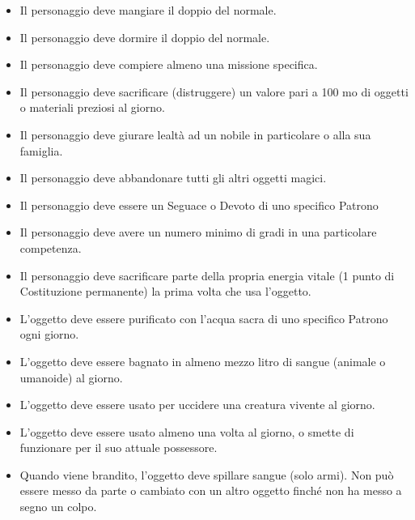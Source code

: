 \begin{multicols}{2}
\begin{itemize}
\item Il personaggio deve mangiare il doppio del normale.
\item Il personaggio deve dormire il doppio del normale.
\item Il personaggio deve compiere almeno una missione specifica.
\item Il personaggio deve sacrificare (distruggere) un valore pari a 100 mo di oggetti o materiali preziosi al giorno.
\item Il personaggio deve giurare lealtà ad un nobile in particolare o alla sua famiglia.
\item Il personaggio deve abbandonare tutti gli altri oggetti magici.
\item Il personaggio deve essere un Seguace o Devoto di uno specifico Patrono
\item Il personaggio deve avere un numero minimo di gradi in una particolare competenza.
\item Il personaggio deve sacrificare parte della propria energia vitale (1 punto di Costituzione permanente) la prima volta che usa l'oggetto.
\item L'oggetto deve essere purificato con l'acqua sacra di uno specifico Patrono ogni giorno.
\item L'oggetto deve essere bagnato in almeno mezzo litro di sangue (animale o umanoide) al giorno.
\item L'oggetto deve essere usato per uccidere una creatura vivente al giorno.
\item L'oggetto deve essere usato almeno una volta al giorno, o smette di funzionare per il suo attuale possessore.
\item Quando viene brandito, l'oggetto deve spillare sangue (solo armi). Non può essere messo da parte o cambiato con un altro oggetto finché non ha messo a segno un colpo.
\end{itemize}

\medskip


\end{multicols}
